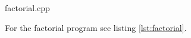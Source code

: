 \documentclass[a4paper, 12pt]{article}
\begin{document}

                 {factorial.cpp}

For the factorial program see listing \ref{lst:factorial}.
\end{document}
